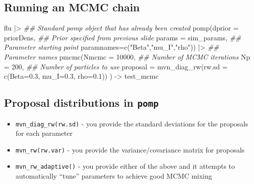 \documentclass[
  letterpaper,
  DIV=11,
  numbers=noendperiod]{scrartcl}
\newenvironment{Shaded}{\begin{snugshade}}{\end{snugshade}}
\newcommand{\AttributeTok}[1]{\textcolor[rgb]{0.40,0.45,0.13}{#1}}
\newcommand{\DecValTok}[1]{\textcolor[rgb]{0.68,0.00,0.00}{#1}}
\newcommand{\DocumentationTok}[1]{\textcolor[rgb]{0.37,0.37,0.37}{\textit{#1}}}
\newcommand{\FloatTok}[1]{\textcolor[rgb]{0.68,0.00,0.00}{#1}}
\newcommand{\FunctionTok}[1]{\textcolor[rgb]{0.28,0.35,0.67}{#1}}
\newcommand{\NormalTok}[1]{\textcolor[rgb]{0.00,0.23,0.31}{#1}}
\newcommand{\OtherTok}[1]{\textcolor[rgb]{0.00,0.23,0.31}{#1}}
\newcommand{\SpecialCharTok}[1]{\textcolor[rgb]{0.37,0.37,0.37}{#1}}
\newcommand{\StringTok}[1]{\textcolor[rgb]{0.13,0.47,0.30}{#1}}
\providecommand{\tightlist}{%
  \setlength{\itemsep}{0pt}\setlength{\parskip}{0pt}}\usepackage{longtable,booktabs,array}
\begin{document}
\hypertarget{running-an-mcmc-chain}{%
\subsection{Running an MCMC chain}\label{running-an-mcmc-chain}}

\begin{Shaded}
\begin{Highlighting}[]
\NormalTok{flu }\SpecialCharTok{|\textgreater{}} \DocumentationTok{\#\# Standard pomp object that has already been created }
  \FunctionTok{pomp}\NormalTok{(}\AttributeTok{dprior =}\NormalTok{ priorDens, }\DocumentationTok{\#\# Prior specified from previous slide}
       \AttributeTok{params =}\NormalTok{ sim\_params, }\DocumentationTok{\#\# Parameter starting point}
       \AttributeTok{paramnames=}\FunctionTok{c}\NormalTok{(}\StringTok{"Beta"}\NormalTok{,}\StringTok{"mu\_I"}\NormalTok{,}\StringTok{"rho"}\NormalTok{)) }\SpecialCharTok{|\textgreater{}} \DocumentationTok{\#\# Parameter names}
  \FunctionTok{pmcmc}\NormalTok{(}\AttributeTok{Nmcmc =} \DecValTok{10000}\NormalTok{, }\DocumentationTok{\#\# Number of MCMC iterations}
        \AttributeTok{Np =} \DecValTok{200}\NormalTok{, }\DocumentationTok{\#\# Number of particles to use}
        \AttributeTok{proposal =} \FunctionTok{mvn\_diag\_rw}\NormalTok{(}\AttributeTok{rw.sd =} \FunctionTok{c}\NormalTok{(}\AttributeTok{Beta=}\FloatTok{0.3}\NormalTok{, }\AttributeTok{mu\_I=}\FloatTok{0.3}\NormalTok{, }\AttributeTok{rho=}\FloatTok{0.1}\NormalTok{))}
\NormalTok{  ) }\OtherTok{{-}\textgreater{}}\NormalTok{ test\_mcmc}
\end{Highlighting}
\end{Shaded}

\hypertarget{proposal-distributions-in-pomp}{%
\subsection{\texorpdfstring{Proposal distributions in
\texttt{pomp}}{Proposal distributions in pomp}}\label{proposal-distributions-in-pomp}}

\Large

\begin{itemize}
\tightlist
\item
  \texttt{mvn\_diag\_rw(rw.sd)} - you provide the standard deviations
  for the proposals for each parameter
\item
  \texttt{mvn\_rw(rw.var)} - you provide the variance/covariance matrix
  for proposals
\item
  \texttt{mvn\_rw\_adaptive()} - you provide either of the above and it
  attempts to automatically ``tune'' parameters to achieve good MCMC
  mixing
\end{itemize}
\end{document}
